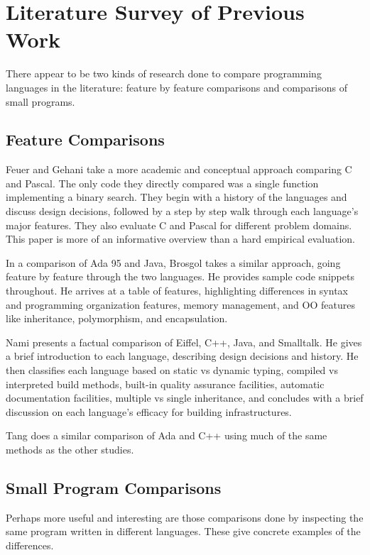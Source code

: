\documentclass{article}
\begin{document}
\section{Literature Survey of Previous Work}

There appear to be two kinds of research done to compare programming languages
in the literature: feature by feature comparisons and comparisons of small
programs.

\subsection{Feature Comparisons}

Feuer and Gehani take a more academic and conceptual approach comparing C and
Pascal.\cite{FeuerCVsPascal}  The only code they directly compared was a single
function implementing a binary search.  They begin with a history of the
languages and discuss design decisions, followed by a step by step walk through
each language's major features.  They also evaluate C and Pascal for different
problem domains.  This paper is more of an informative overview than a hard
empirical evaluation.

In a comparison of Ada 95 and Java, Brosgol takes a similar
approach,\cite{BrosgolCompOOAdaVsJava} going feature by feature through the two
languages. He provides sample code snippets throughout.  He arrives at a table
of features, highlighting differences in syntax and programming organization
features, memory management, and OO features like inheritance, polymorphism, and
encapsulation.

Nami presents a factual comparison of Eiffel, C++, Java, and
Smalltalk\cite{NamiCompOOSoftEng}.  He gives a brief introduction to each
language, describing design decisions and history.  He then classifies each
language based on static vs dynamic typing, compiled vs interpreted build
methods, built-in quality assurance facilities, automatic documentation
facilities, multiple vs single inheritance, and concludes with a brief
discussion on each language's efficacy for building infrastructures.

Tang does a similar comparison of Ada and C++ using much of the same methods as
the other studies.\cite{TangAdaVsCpp}

\subsection{Small Program Comparisons}

Perhaps more useful and interesting are those comparisons done by inspecting
the same program written in different languages.  These give concrete examples
of the differences.
\end{document}
